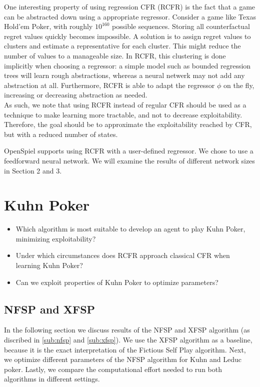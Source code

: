 \documentclass[10pt,a4paper]{article}
\begin{document}
One interesting property of using regression CFR (RCFR) is the fact that a game can be abstracted down using a appropriate regressor. Consider a game like Texas Hold'em Poker, with roughly $10^{160}$ possible sequences. Storing all counterfactual regret values quickly becomes impossible. A solution is to assign regret values to clusters and estimate a representative for each cluster. This might reduce the number of values to a manageable size. In RCFR, this clustering is done implicitly when choosing a regressor: a simple model such as bounded regression trees will learn rough abstractions, whereas a neural netwerk may not add any abstraction at all. Furthermore, RCFR is able to adapt the regressor $\phi$ on the fly, increasing or decreasing abstraction as needed.\\

As such, we note that using RCFR instead of regular CFR should be used as a technique to make learning more tractable, and not to decrease exploitability. Therefore, the goal should be to approximate the exploitability reached by CFR, but with a reduced number of states.

OpenSpiel supports using RCFR with a user-defined regressor. We chose to use a feedforward neural network. We will examine the results of different network sizes in Section 2 and 3.

\section{Kuhn Poker}
\begin{tcolorbox}
\begin{itemize}
\item{Which algorithm is most suitable to develop an agent to play Kuhn Poker, minimizing exploitability?}
\item{Under which circumstances does RCFR approach classical CFR when learning Kuhn Poker?}
\item{Can we exploit properties of Kuhn Poker to optimize parameters?}
\end{itemize}
\end{tcolorbox}

\subsection{NFSP and XFSP}
In the following section we discuss results of the NFSP and XFSP algorithm (as discribed in \ref{sub:nfsp} and \ref{sub:xfsp}). We use the XFSP algorithm as a baseline, because it is the exact interpretation of the Fictious Self Play algorithm. Next, we optimize different parameters of the NFSP algorithm for Kuhn and Leduc poker. Lastly, we compare the computational effort needed to run both algorithms in different settings.
\end{document}
